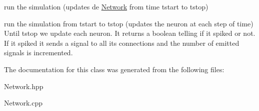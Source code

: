run the simulation (updates de \hyperlink{classNetwork}{Network} from time tstart to tstop) 

run the simulation from tstart to tstop (updates the neuron at each step of time) Until tstop we update each neuron. It returns a boolean telling if it spiked or not. If it spiked it sends a signal to all its connections and the number of emitted signals is incremented. 

The documentation for this class was generated from the following files\-:\begin{DoxyCompactItemize}
\item 
Network.\-hpp\item 
Network.\-cpp\end{DoxyCompactItemize}
